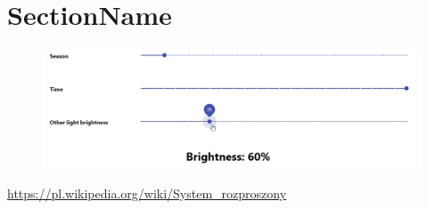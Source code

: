 \documentclass[12pt]{article}
\newenvironment{centerfig}
{\begin{figure}[H]\centering}
{\end{figure}}
\begin{document}
\section{SectionName}

\begin{centerfig}
  \includegraphics[width=\textwidth]{img/1.png}
\end{centerfig}


\begin{thebibliography}{9}
  \url{https://pl.wikipedia.org/wiki/System_rozproszony}

\end{thebibliography}
\end{document}
